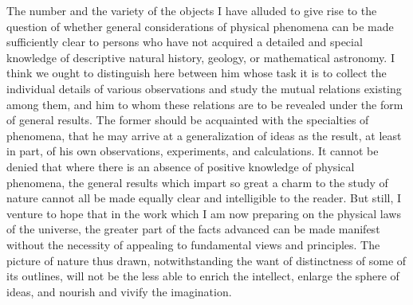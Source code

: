 The number and the variety of the objects I have alluded to give rise to the question of whether general considerations of physical phenomena can be made sufficiently clear to persons who have not acquired a detailed and special knowledge of descriptive natural history, geology, or mathematical astronomy. I think we ought to distinguish here between him whose task it is to collect the individual details of various observations and study the mutual relations existing among them, and him to whom these relations are to be revealed under the form of general results. The former should be acquainted with the specialties of phenomena, that he may arrive at a generalization of ideas as the result, at least in part, of his own observations, experiments, and calculations. It cannot be denied that where there is an absence of positive knowledge of physical phenomena, the general results which impart so great a charm to the study of nature cannot all be made equally clear and intelligible to the reader. But still, I venture to hope that in the work which I am now preparing on the physical laws of the universe, the greater part of the facts advanced can be made manifest without the necessity of appealing to fundamental views and principles. The picture of nature thus drawn, notwithstanding the want of distinctness of some of its outlines, will not be the less able to enrich the intellect, enlarge the sphere of ideas, and nourish and vivify the imagination.

